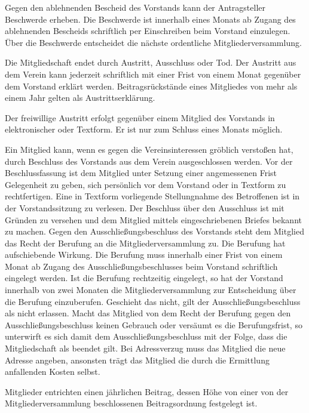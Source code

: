 \documentclass[parskip]{scrartcl}
\begin{document}
\begin{contract}
Gegen den ablehnenden Bescheid des Vorstands kann der Antragsteller Beschwerde erheben. Die Beschwerde ist innerhalb eines Monats ab Zugang des ablehnenden Bescheids schriftlich per Einschreiben beim Vorstand einzulegen. Über die Beschwerde entscheidet die nächste ordentliche Mitgliederversammlung.


Die Mitgliedschaft endet durch Austritt, Ausschluss oder Tod. Der Austritt aus dem Verein kann jederzeit schriftlich mit einer Frist von einem Monat gegenüber dem Vorstand erklärt werden. Beitragsrückstände eines Mitgliedes von mehr als einem Jahr gelten als Austrittserklärung.

Der freiwillige Austritt erfolgt gegenüber einem Mitglied des Vorstands in elektronischer oder Textform. Er ist nur zum Schluss eines Monats möglich.

Ein Mitglied kann, wenn es gegen die Vereinsinteressen gröblich verstoßen hat, durch Beschluss des Vorstands aus dem Verein ausgeschlossen werden. Vor der Beschlussfassung ist dem Mitglied unter Setzung einer angemessenen Frist Gelegenheit zu geben, sich persönlich vor dem Vorstand oder in Textform zu rechtfertigen. Eine in Textform vorliegende Stellungnahme des Betroffenen ist in der Vorstandssitzung zu verlesen. Der Beschluss über den Ausschluss ist mit Gründen zu versehen und dem Mitglied mittels eingeschriebenen Briefes bekannt zu machen. Gegen den Ausschließungsbeschluss des Vorstands steht dem Mitglied das Recht der Berufung an die Mitgliederversammlung zu. Die Berufung hat aufschiebende Wirkung. Die Berufung muss innerhalb einer Frist von einem Monat ab Zugang des Ausschließungsbeschlusses beim Vorstand schriftlich eingelegt werden. Ist die Berufung rechtzeitig eingelegt, so hat der Vorstand innerhalb von zwei Monaten die Mitgliederversammlung zur Entscheidung über die Berufung einzuberufen. Geschieht das nicht, gilt der Ausschließungsbeschluss als nicht erlassen. Macht das Mitglied von dem Recht der Berufung gegen den Ausschließungsbeschluss keinen Gebrauch oder versäumt es die Berufungsfrist, so unterwirft es sich damit dem Ausschließungsbeschluss mit der Folge, dass die Mitgliedschaft als beendet gilt.
Bei Adressverzug muss das Mitglied die neue Adresse angeben, ansonsten trägt das
Mitglied die durch die Ermittlung anfallenden Kosten selbst. 


Mitglieder entrichten einen jährlichen Beitrag, dessen Höhe von einer von der Mitgliederversammlung beschlossenen Beitragsordnung festgelegt ist.


\end{contract}
\end{document}
